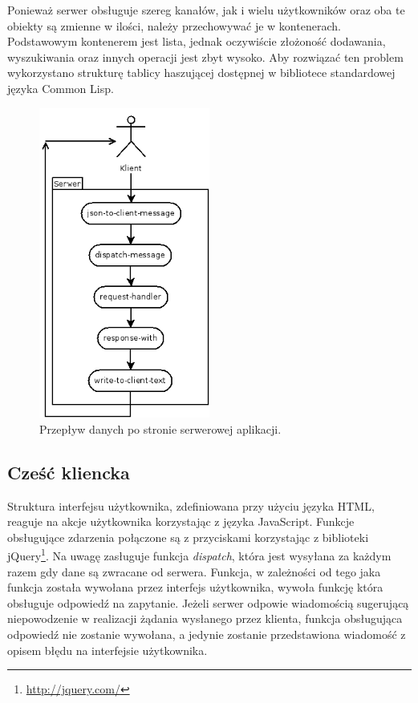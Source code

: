 Ponieważ serwer obsługuje szereg kanałów, jak i wielu użytkowników oraz oba te obiekty są zmienne w ilości, należy przechowywać je w kontenerach. Podstawowym kontenerem jest lista, jednak oczywiście złożoność dodawania, wyszukiwania oraz innych operacji jest zbyt wysoko. Aby rozwiązać ten problem wykorzystano strukturę tablicy haszującej dostępnej w bibliotece standardowej języka Common Lisp.
\begin{figure}[ht]
    \centering
    \includegraphics[width=0.5\textwidth]{imgs/serverflow.png}
    \caption{Przepływ danych po stronie serwerowej aplikacji.}
    \label{fig:serverflow}
\end{figure}

\subsection{Cześć kliencka}
Struktura interfejsu użytkownika, zdefiniowana przy użyciu języka HTML, reaguje na akcje użytkownika korzystając z języka JavaScript. Funkcje obsługujące zdarzenia połączone są z przyciskami korzystając z biblioteki jQuery\footnote{\url{http://jquery.com/}}. Na uwagę zasługuje funkcja \emph{dispatch}, która jest wysyłana za każdym razem gdy dane są zwracane od serwera. Funkcja, w zależności od tego jaka funkcja została wywołana przez interfejs użytkownika, wywoła funkcję która obsługuje odpowiedź na zapytanie. Jeżeli serwer odpowie wiadomością sugerującą niepowodzenie w realizacji żądania wysłanego przez klienta, funkcja obsługująca odpowiedź nie zostanie wywołana, a jedynie zostanie przedstawiona wiadomość z opisem błędu na interfejsie użytkownika.

